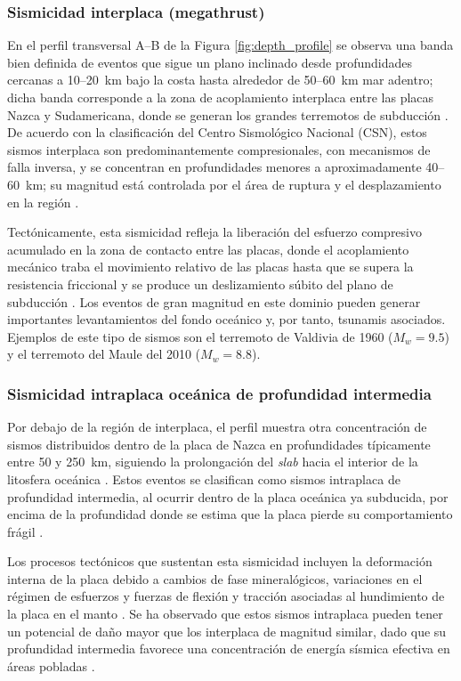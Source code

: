 \documentclass[a4paper,12pt]{article} %
\numberwithin{equation}{section} %
\numberwithin{figure}{section} %
\begin{document}
\subsubsection{Sismicidad interplaca (megathrust)}

En el perfil transversal A--B de la Figura \ref{fig:depth_profile} se observa una banda bien definida de eventos que sigue un plano inclinado desde profundidades cercanas a 10--20~km bajo la costa hasta alrededor de 50--60~km mar adentro; dicha banda corresponde a la zona de acoplamiento interplaca entre las placas Nazca y Sudamericana, donde se generan los grandes terremotos de subducción \cite{fernandez_2018, csn_tipos_sismos}. De acuerdo con la clasificación del Centro Sismológico Nacional (CSN), estos sismos interplaca son predominantemente compresionales, con mecanismos de falla inversa, y se concentran en profundidades menores a aproximadamente 40--60~km; su magnitud está controlada por el área de ruptura y el desplazamiento en la región \cite{csn_tipos_sismos}.

Tectónicamente, esta sismicidad refleja la liberación del esfuerzo compresivo acumulado en la zona de contacto entre las placas, donde el acoplamiento mecánico traba el movimiento relativo de las placas hasta que se supera la resistencia friccional y se produce un deslizamiento súbito del plano de subducción \cite{csn_tipos_sismos,fernandez_2018}. Los eventos de gran magnitud en este dominio pueden generar importantes levantamientos del fondo oceánico y, por tanto, tsunamis asociados. Ejemplos de este tipo de sismos son el terremoto de Valdivia de 1960 ($M_w=9.5$) y el terremoto del Maule del 2010 ($M_w=8.8$).

\subsubsection{Sismicidad intraplaca oceánica de profundidad intermedia}

Por debajo de la región de interplaca, el perfil muestra otra concentración de sismos distribuidos dentro de la placa de Nazca en profundidades típicamente entre 50 y 250~km, siguiendo la prolongación del \emph{slab} hacia el interior de la litosfera oceánica \cite{fernandez_2018, csn_tipos_sismos}. Estos eventos se clasifican como sismos intraplaca de profundidad intermedia, al ocurrir dentro de la placa oceánica ya subducida, por encima de la profundidad donde se estima que la placa pierde su comportamiento frágil \cite{csn_tipos_sismos}.

Los procesos tectónicos que sustentan esta sismicidad incluyen la deformación interna de la placa debido a cambios de fase mineralógicos, variaciones en el régimen de esfuerzos y fuerzas de flexión y tracción asociadas al hundimiento de la placa en el manto \cite{csn_tipos_sismos}. Se ha observado que estos sismos intraplaca pueden tener un potencial de daño mayor que los interplaca de magnitud similar, dado que su profundidad intermedia favorece una concentración de energía sísmica efectiva en áreas pobladas \cite{csn_tipos_sismos}.
\end{document}
